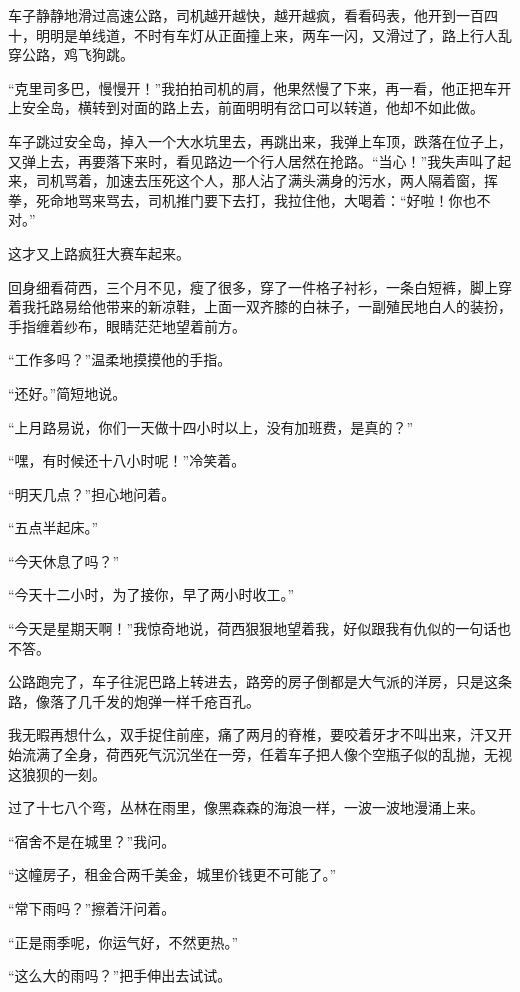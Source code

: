 \par 车子静静地滑过高速公路，司机越开越快，越开越疯，看看码表，他开到一百四十，明明是单线道，不时有车灯从正面撞上来，两车一闪，又滑过了，路上行人乱穿公路，鸡飞狗跳。
\par “克里司多巴，慢慢开！”我拍拍司机的肩，他果然慢了下来，再一看，他正把车开上安全岛，横转到对面的路上去，前面明明有岔口可以转道，他却不如此做。
\par 车子跳过安全岛，掉入一个大水坑里去，再跳出来，我弹上车顶，跌落在位子上，又弹上去，再要落下来时，看见路边一个行人居然在抢路。“当心！”我失声叫了起来，司机骂着，加速去压死这个人，那人沾了满头满身的污水，两人隔着窗，挥拳，死命地骂来骂去，司机推门要下去打，我拉住他，大喝着：“好啦！你也不对。”
\par 这才又上路疯狂大赛车起来。
\par 回身细看荷西，三个月不见，瘦了很多，穿了一件格子衬衫，一条白短裤，脚上穿着我托路易给他带来的新凉鞋，上面一双齐膝的白袜子，一副殖民地白人的装扮，手指缠着纱布，眼睛茫茫地望着前方。
\par “工作多吗？”温柔地摸摸他的手指。
\par “还好。”简短地说。
\par “上月路易说，你们一天做十四小时以上，没有加班费，是真的？”
\par “嘿，有时候还十八小时呢！”冷笑着。
\par “明天几点？”担心地问着。
\par “五点半起床。”
\par “今天休息了吗？”
\par “今天十二小时，为了接你，早了两小时收工。”
\par “今天是星期天啊！”我惊奇地说，荷西狠狠地望着我，好似跟我有仇似的一句话也不答。
\par 公路跑完了，车子往泥巴路上转进去，路旁的房子倒都是大气派的洋房，只是这条路，像落了几千发的炮弹一样千疮百孔。
\par 我无暇再想什么，双手捉住前座，痛了两月的脊椎，要咬着牙才不叫出来，汗又开始流满了全身，荷西死气沉沉坐在一旁，任着车子把人像个空瓶子似的乱抛，无视这狼狈的一刻。
\par 过了十七八个弯，丛林在雨里，像黑森森的海浪一样，一波一波地漫涌上来。
\par “宿舍不是在城里？”我问。
\par “这幢房子，租金合两千美金，城里价钱更不可能了。”
\par “常下雨吗？”擦着汗问着。
\par “正是雨季呢，你运气好，不然更热。”
\par “这么大的雨吗？”把手伸出去试试。
